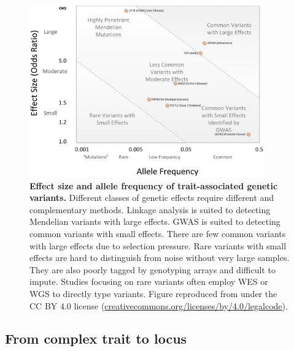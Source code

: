 \begin{figure}
    \centering
    \includegraphics[width=0.9\textwidth,page=1]{mainmatter/figures/chapter_01/bush2012Chapter11GenomeWide/journal.pcbi.1002822.g001.png}
    \caption[
    ]{
        \textbf{Effect size and allele frequency of trait-associated genetic variants.}
        Different classes of genetic effects require different and complementary methods.
        Linkage analysis is suited to detecting Mendelian variants with large effects.
        \gls{GWAS} is suited to detecting common variants with small effects.
        There are few common variants with large effects due to selection pressure.
        Rare variants with small effects are hard to distinguish from noise without very large samples.
        They are also poorly tagged by genotyping arrays and difficult to impute.
        Studies focusing on rare variants often employ \gls{WES} or \gls{WGS} to directly type variants.
        Figure reproduced from \textcite{bush2012Chapter11GenomeWide} under the CC BY 4.0 license (\url{creativecommons.org/licenses/by/4.0/legalcode}).
    }
    \label{fig:intro_effectSizeVsFrequency}
\end{figure}

\subsection{From complex trait to locus}

